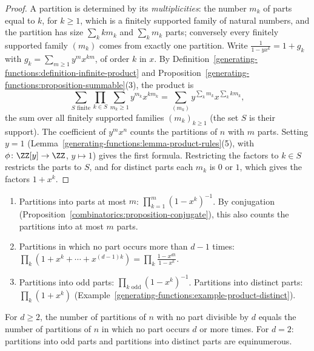 \begin{proof}
A partition is determined by its \emph{multiplicities}: the number $m_k$ of parts equal to $k$, for $k \geq 1$, which is a finitely supported family of natural numbers, and the partition has size
$\sum_kkm_k$ and $\sum_km_k$ parts; conversely every finitely supported family $(m_k)$ comes from exactly one partition. Write $\frac{1}{1 - yx^k} = 1 + g_k$ with $g_k = \sum_{m \geq 1}y^mx^{km}$,
of order $k$ in $x$. By Definition~\ref{generating-functions:definition-infinite-product} and Proposition~\ref{generating-functions:proposition-summable}(3), the product is
\[
\sum_{S \text{ finite}}\prod_{k \in S}\sum_{m_k \geq 1}y^{m_k}x^{km_k} = \sum_{(m_k)}y^{\sum_km_k}x^{\sum_kkm_k},
\]
the sum over all finitely supported families $(m_k)_{k \geq 1}$ (the set $S$ is their support). The coefficient of $y^mx^n$ counts the partitions of $n$ with $m$ parts. Setting $y = 1$
(Lemma~\ref{generating-functions:lemma-product-rules}(5), with $\phi \colon \ZZ[y] \to \ZZ$, $y \mapsto 1$) gives the first formula. Restricting the factors to $k \in S$ restricts the parts to $S$,
and for distinct parts each $m_k$ is $0$ or $1$, which gives the factors $1 + x^k$.
\end{proof}

\begin{example}\label{generating-functions:example-partition-gf-variants}
\begin{enumerate}
\item Partitions into parts at most $m$: $\prod_{k=1}^{m}(1 - x^k)^{-1}$. By conjugation (Proposition~\ref{combinatorics:proposition-conjugate}), this also counts the partitions into at most $m$
parts.
\item Partitions in which no part occurs more than $d - 1$ times: $\prod_k(1 + x^k + \cdots + x^{(d-1)k}) = \prod_k\frac{1 - x^{dk}}{1 - x^k}$.
\item Partitions into odd parts: $\prod_{k \text{ odd}}(1 - x^k)^{-1}$. Partitions into distinct parts: $\prod_k(1 + x^k)$ (Example~\ref{generating-functions:example-product-distinct}).
\end{enumerate}
\end{example}

\begin{corollary}\label{generating-functions:corollary-glaisher}
For $d \geq 2$, the number of partitions of $n$ with no part divisible by $d$ equals the number of partitions of $n$ in which no part occurs $d$ or more times. For $d = 2$: partitions into odd parts
and partitions into distinct parts are equinumerous.
\end{corollary}

